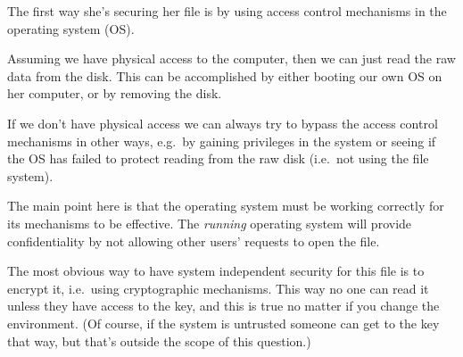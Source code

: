   \begin{solution}
    The first way she's securing her file is by using access control mechanisms 
    in the operating system (OS).

    Assuming we have physical access to the computer, then we can just read the 
    raw data from the disk.
    This can be accomplished by either booting our own OS on her computer, or 
    by removing the disk.

    If we don't have physical access we can always try to bypass the access 
    control mechanisms in other ways, e.g.\ by gaining privileges in the system 
    or seeing if the OS has failed to protect reading from the raw disk (i.e.\ 
    not using the file system).

    The main point here is that the operating system must be working correctly 
    for its mechanisms to be effective.
    The \emph{running} operating system will provide confidentiality by not 
    allowing other users' requests to open the file.

    The most obvious way to have system independent security for this file is 
    to encrypt it, i.e.~using cryptographic mechanisms.
    This way no one can read it unless they have access to the key, and this is 
    true no matter if you change the environment.
    (Of course, if the system is untrusted someone can get to the key that way, 
    but that's outside the scope of this question.)
  \end{solution}


  
